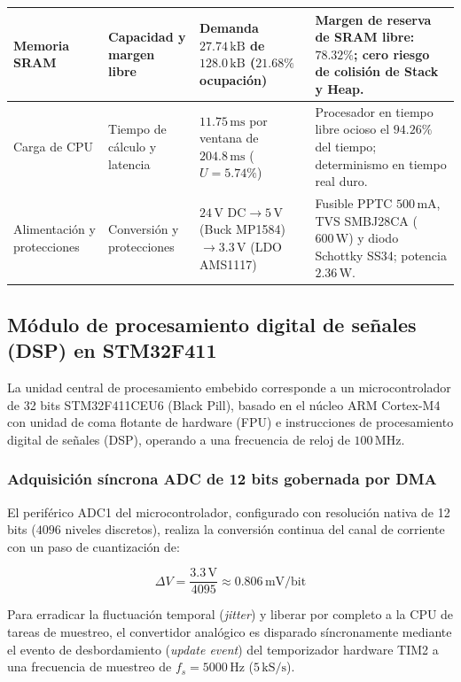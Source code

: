 {\begin{longtable}{L{2.5cm}L{2.9cm}L{3.3cm}L{4.5cm}}
Memoria SRAM & Capacidad y margen libre & Demanda $27.74\,\text{kB}$ de $128.0\,\text{kB}$ ($21.68\%$ ocupación) & Margen de reserva de SRAM libre: $78.32\%$; cero riesgo de colisión de Stack y Heap. \\ \hline
Carga de CPU & Tiempo de cálculo y latencia & $11.75\,\text{ms}$ por ventana de $204.8\,\text{ms}$ ($U = 5.74\%$) & Procesador en tiempo libre ocioso el $94.26\%$ del tiempo; determinismo en tiempo real duro. \\ \hline
Alimentación y protecciones & Conversión y protecciones & $24\,\text{V DC} \rightarrow 5\,\text{V}$ (Buck MP1584) $\rightarrow 3.3\,\text{V}$ (LDO AMS1117) & Fusible PPTC $500\,\text{mA}$, TVS SMBJ28CA ($600\,\text{W}$) y diodo Schottky SS34; potencia $2.36\,\text{W}$. \\ \hline

\end{longtable}
}

\subsection{Módulo de procesamiento digital de señales (DSP) en STM32F411}
\label{subsec:modulo_dsp}

La unidad central de procesamiento embebido corresponde a un microcontrolador de 32 bits STM32F411CEU6 (Black Pill), basado en el núcleo ARM Cortex-M4 con unidad de coma flotante de hardware (FPU) e instrucciones de procesamiento digital de señales (DSP), operando a una frecuencia de reloj de $100\,\text{MHz}$.

\subsubsection{Adquisición síncrona ADC de 12 bits gobernada por DMA}
El periférico ADC1 del microcontrolador, configurado con resolución nativa de 12 bits ($4096$ niveles discretos), realiza la conversión continua del canal de corriente con un paso de cuantización de:

\begin{equation}
\Delta V = \frac{3.3\,\text{V}}{4095} \approx 0.806\,\text{mV/bit}
\end{equation}

Para erradicar la fluctuación temporal (\textit{jitter}) y liberar por completo a la CPU de tareas de muestreo, el convertidor analógico es disparado síncronamente mediante el evento de desbordamiento (\textit{update event}) del temporizador hardware TIM2 a una frecuencia de muestreo de $f_s = 5000\,\text{Hz}$ ($5\,\text{kS/s}$). 

